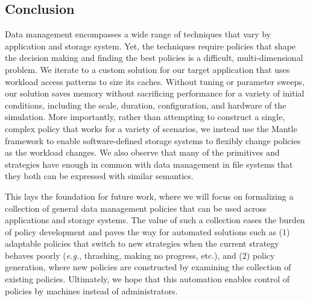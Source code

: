 \subsection{Conclusion}

Data management encompasses a wide range of techniques that vary by application
and storage system.  Yet, the techniques require policies that shape the
decision making and finding the best policies is a difficult, multi-dimensional
problem.  We iterate to a custom solution for our target application that uses
workload access patterns to size its caches. Without tuning or parameter
sweeps, our solution saves memory without sacrificing performance for a variety
of initial conditions, including the scale, duration, configuration, and
hardware of the simulation. More importantly, rather than attempting to
construct a single, complex policy that works for a variety of scenarios, we
instead use the Mantle framework to enable software-defined storage systems to
flexibly change policies as the workload changes.  We also observe that many of
the primitives and strategies have enough in common with data management in
file systems that they both can be expressed with similar semantics.

This lays the foundation for future work, where we will focus on formalizing a
collection of general data management policies that can be used across
applications and storage systems.  The value of such a collection eases the
burden of policy development and paves the way for automated solutions such as
(1) adaptable policies that switch to new strategies when the current strategy
behaves poorly ({\it e.g.}, thrashing, making no progress, etc.), and (2)
policy generation, where new policies are constructed by examining the
collection of existing policies.  Ultimately, we hope that this automation
enables control of policies by machines instead of administrators. 
